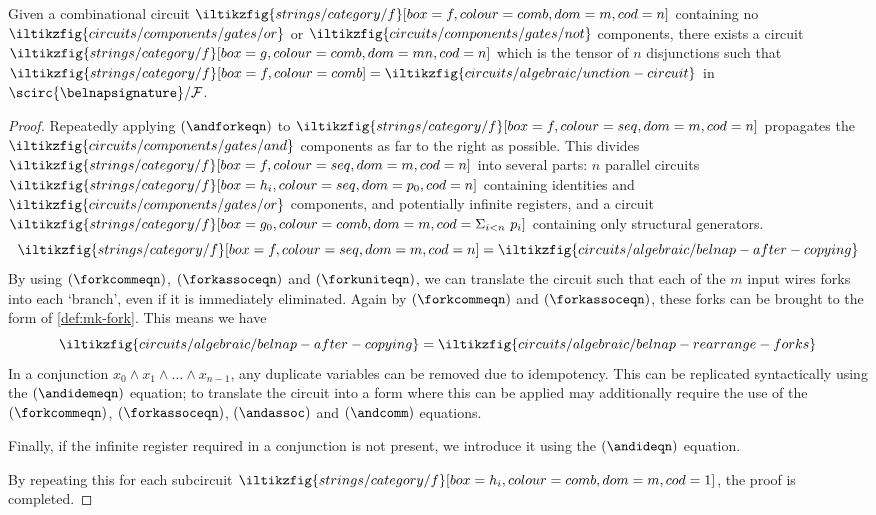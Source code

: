 \begin{lemma}\label{lem:conjunction-normalising}
    Given a combinational circuit \(
    \iltikzfig{strings/category/f}[box=f,colour=comb,dom=m,cod=n]
    \) containing no \(
    \iltikzfig{circuits/components/gates/or}
    \) or \(
    \iltikzfig{circuits/components/gates/not}
    \) components, there exists a circuit \(
    \iltikzfig{strings/category/f}[box=g,colour=comb,dom=mn,cod=n]
    \) which is the tensor of \(n\) disjunctions such that \(
    \iltikzfig{strings/category/f}[box=f,colour=comb]
    =
    \iltikzfig{circuits/algebraic/unction-circuit}
    \) in \(\scirc{\belnapsignature} / \mathcal{F}\).
\end{lemma}
\begin{proof}
    Repeatedly applying \((\andforkeqn)\) to \(
    \iltikzfig{strings/category/f}[box=f,colour=seq,dom=m,cod=n]
    \) propagates the \(
    \iltikzfig{circuits/components/gates/and}
    \) components as far to the right
    as possible.
    This divides \(
    \iltikzfig{strings/category/f}[box=f,colour=seq,dom=m,cod=n]
    \) into several parts: \(n\) parallel circuits \(
    \iltikzfig{strings/category/f}[box=h_i,colour=seq,dom=p_0,cod=n]
    \) containing identities and \(
    \iltikzfig{circuits/components/gates/or}
    \) components, and potentially infinite registers, and a circuit \(
    \iltikzfig{strings/category/f}[box=g_0,colour=comb,dom=m,cod={\Sigma_{i<n}\ p_i}]
    \) containing only structural generators.
    \[
        \iltikzfig{strings/category/f}[box=f,colour=seq,dom=m,cod=n]
        =
        \iltikzfig{circuits/algebraic/belnap-after-copying}
    \]
    By using \((\forkcommeqn)\), \((\forkassoceqn)\) and \((\forkuniteqn)\),
    we can translate the circuit such that each of the \(m\) input wires forks
    into each `branch', even if it is immediately eliminated.
    Again by \((\forkcommeqn)\) and \((\forkassoceqn)\), these forks can be
    brought to the form of \cref{def:mk-fork}.
    This means we have \[
        \iltikzfig{circuits/algebraic/belnap-after-copying}
        =
        \iltikzfig{circuits/algebraic/belnap-rearrange-forks}
    \]
    In a conjunction \(x_0 \land x_1 \land \dots \land x_{n-1}\), any duplicate
    variables can be removed due to idempotency.
    This can be replicated syntactically using the \((\andidemeqn)\) equation;
    to translate the circuit into a form where this can be applied may
    additionally require the use of the \((\forkcommeqn)\), \((\forkassoceqn)\),
    \((\andassoc)\) and \((\andcomm)\) equations.

    Finally, if the infinite register required in a conjunction is not present,
    we introduce it using the \((\andideqn)\) equation.

    By repeating this for each subcircuit \(
    \iltikzfig{strings/category/f}[box=h_i,colour=comb,dom=m,cod=1]
    \), the proof is completed.
\end{proof}

